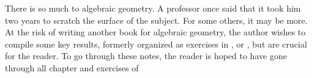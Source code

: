 
There is so much to algebraic geometry. A professor once said that 
it took him two years to scratch the surface of the subject. For 
some others, it may be more. At the risk of writing another book
for algebraic geometry, the author wishes to compile some key 
results, formerly organized as exercises in \cite{Hart}, 
\cite{Liu} or \cite{Mum}, but are crucial for the reader. To go
through these notes, the reader is hoped to have gone through all
chapter and exercises of \cite{AM}
